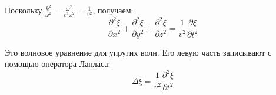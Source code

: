 \documentclass{article}
\begin{document}
	Поскольку $\frac{k^2}{\omega^2}=\frac{\omega^2}{v^2\omega^2}=\frac{1}{v^2}$, получаем:
	\begin{equation}
		\frac{\partial^2\xi}{\partial x^2}+\frac{\partial^2\xi}{\partial y^2}+\frac{\partial^2\xi}{\partial z^2} = \frac{1}{v^2}\frac{\partial\xi}{\partial t^2}	
	\end{equation}

	Это волновое уравнение для упругих волн. Его левую часть записывают с помощью оператора Лапласа:
	\begin{equation}
		\Delta\xi = \frac{1}{v^2}\frac{\partial^2\xi}{\partial t^2}
	\end{equation}
\end{document}
